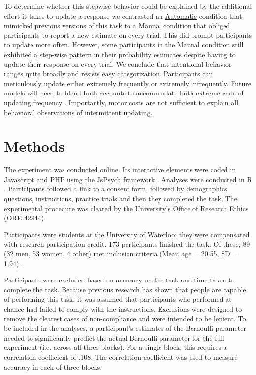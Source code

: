 \documentclass[sn-apa]{sn-jnl}\usepackage[]{graphicx}\usepackage[]{xcolor}
\begin{document}
To determine whether this stepwise behavior could be explained by the additional effort it takes to update a response we contrasted an \underline{Automatic} condition that mimicked previous versions of this task to a \underline{Manual} condition that obliged participants to report a new estimate on every trial. This did prompt participants to update more often. However, some participants in the Manual condition still exhibited a step-wise pattern in their probability estimates despite having to update their response on every trial. We conclude that intentional behavior ranges quite broadly and resists easy categorization. Participants can meticulously update either extremely frequently or extremely infrequently. Future models will need to blend both accounts to accommodate both extreme ends of updating frequency \citep{forsgren2023further}. Importantly, motor costs are not sufficient to explain all behavioral observations of intermittent updating.







\section{Methods}\label{sec-meth}



The experiment was conducted online. Its interactive elements were coded in Javascript and PHP using the JsPsych framework \cite{de2015jspsych}. Analyses were conducted in R \cite{rcore2022}. Participants followed a link to a consent form, followed by demographics questions, instructions, practice trials and then they completed the task. The experimental procedure was cleared by the University's Office of Research Ethics (ORE 42844).

Participants were students at the University of Waterloo; they were compensated with research participation credit. 173 participants finished the task. Of these, 89 (32 men, 53 women, 4 other) met inclusion criteria (Mean age = 20.55, SD =  1.94). 

Participants were excluded based on accuracy on the task and time taken to complete the task. Because previous research has shown that people are capable of performing this task, it was assumed that participants who performed at chance had failed to comply with the instructions. Exclusions were designed to remove the clearest cases of non-compliance and were intended to be lenient. To be included in the analyses, a participant's estimates of the Bernoulli parameter needed to significantly predict the actual Bernoulli parameter for the full experiment (i.e. across all three blocks). For a single block, this requires a correlation coefficient of .108. The correlation-coefficient was used to measure accuracy in each of three blocks. 
\end{document}
